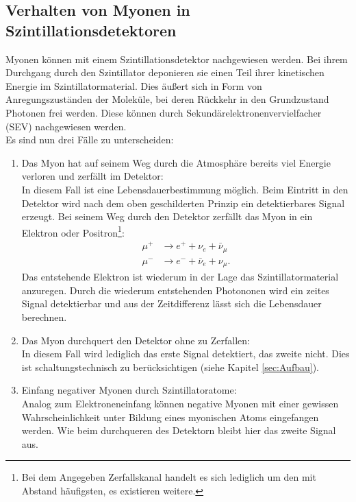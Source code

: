   \subsection{Verhalten von Myonen in Szintillationsdetektoren}
  Myonen können mit einem Szintillationsdetektor nachgewiesen werden. Bei ihrem Durchgang
  durch den Szintillator deponieren sie einen Teil ihrer kinetischen Energie im Szintillatormaterial.
  Dies äußert sich in Form von Anregungszuständen der Moleküle, bei deren Rückkehr in
  den Grundzustand Photonen frei werden. Diese können durch Sekundärelektronenvervielfacher
  (SEV) nachgewiesen werden.\\
  Es sind nun drei Fälle zu unterscheiden:
    \begin{enumerate}
    \item Das Myon hat auf seinem Weg durch die Atmosphäre bereits viel Energie
    verloren und zerfällt im Detektor:\\
    In diesem Fall ist eine Lebensdauerbestimmung möglich. Beim Eintritt in den Detektor
    wird nach dem oben geschilderten Prinzip ein detektierbares Signal erzeugt. Bei
    seinem Weg durch den Detektor zerfällt das Myon in ein Elektron oder Positron\footnote{
    Bei dem Angegeben Zerfallskanal handelt es sich lediglich um den mit Abstand häufigsten,
    es existieren weitere.}:
    \begin{align*}
      \mu^+ &\to e^+ + \nu_{e} + \bar{\nu}_{\mu}\\
      \mu^- &\to e^- + \bar{\nu}_{e} +  \nu_{\mu}.
    \end{align*}
    Das entstehende Elektron ist wiederum in der Lage das Szintillatormaterial anzuregen.
    Durch die wiederum entstehenden Photononen wird ein zeites Signal detektierbar
    und aus der Zeitdifferenz lässt sich die Lebensdauer berechnen.
    \item Das Myon durchquert den Detektor ohne zu Zerfallen:\\
    In diesem Fall wird lediglich das erste Signal detektiert, das zweite nicht.
    Dies ist schaltungstechnisch zu berücksichtigen (siehe Kapitel \ref{sec:Aufbau}).
    \item Einfang negativer Myonen durch Szintillatoratome:\\
    Analog zum Elektroneneinfang können negative Myonen mit einer gewissen Wahrscheinlichkeit
    unter Bildung eines myonischen Atoms eingefangen werden. Wie beim durchqueren
    des Detektorn bleibt hier das zweite Signal aus.
    \end{enumerate}
